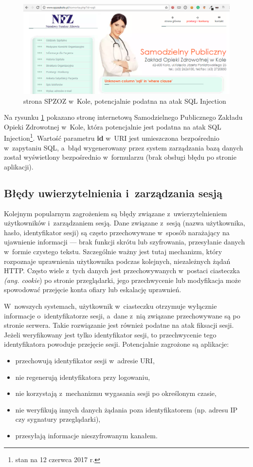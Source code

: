 \documentclass[12pt,a4paper,polish,thesis]{dcsbook}
\begin{document}
\begin{figure}[h]
\centering
\includegraphics[scale=0.4]{szpital}

\caption{strona SPZOZ w~Kole, potencjalnie podatna na atak SQL Injection}
\label{fig:szpital}
\end{figure}

Na rysunku \ref{fig:szpital} pokazano stronę internetową Samodzielnego Publicznego Zakładu Opieki Zdrowotnej w~Kole, która potencjalnie jest podatna na atak SQL Injection\footnote{stan na 12 czerwca 2017 r.}. Wartość parametru \textbf{id} w~URI jest umieszczona bezpośrednio w~zapytaniu SQL, a~błąd wygenerowany przez system zarządzania bazą danych został wyświetlony bezpośrednio w~formularzu (brak obsługi błędu po stronie aplikacji).

\subsection{Błędy uwierzytelnienia i~zarządzania sesją}
Kolejnym popularnym zagrożeniem są błędy związane z~uwierzytelnieniem użytkowników i~zarządzaniem sesją. Dane związane z~sesją (nazwa użytkownika, hasło, identyfikator sesji) są często przechowywane w~sposób narażający na ujawnienie informacji --- brak funkcji skrótu lub szyfrowania, przesyłanie danych w~formie czystego tekstu. Szczególnie ważny jest tutaj mechanizm, który rozpoznaje uprawnienia użytkownika podczas kolejnych, niezależnych żądań HTTP. Często wiele z~tych danych jest przechowywanych w~postaci ciasteczka \textit{(ang. cookie}) po stronie przeglądarki, jego przechwycenie lub modyfikacja może spowodować przejęcie konta ofiary lub eskalację uprawnień.

 W~nowszych systemach, użytkownik w~ciasteczku otrzymuje wyłącznie informacje o~identyfikatorze sesji, a~dane z~nią związane przechowywane są po stronie serwera. Takie rozwiązanie jest również podatne na atak fiksacji sesji. Jeżeli weryfikowany jest tylko identyfikator sesji, to przechwycenie tego identyfikatora powoduje przejęcie sesji. Potencjalnie zagrożone są aplikacje:
\begin{itemize}
\item przechowują identyfikator sesji w~adresie URI,
\item nie regenerują identyfikatora przy logowaniu,
\item nie korzystają z~mechanizmu wygasania sesji po określonym czasie,
\item nie weryfikują innych danych żądania poza identyfikatorem (np. adresu IP czy sygnatury przeglądarki),
\item przesyłają informacje nieszyfrowanym kanałem.
\end{itemize}
\end{document}
